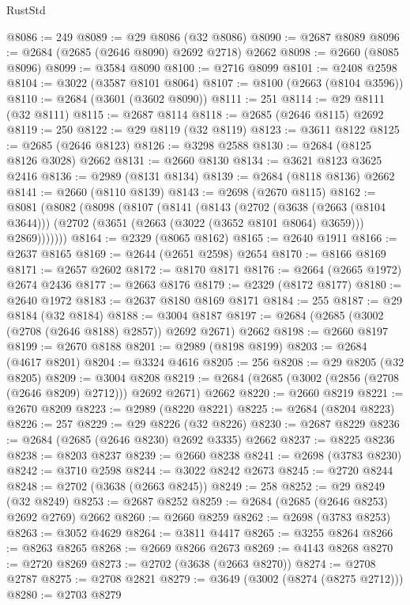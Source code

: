 \begin{lexlean}{RustStd}
\begin{coremodule}
@8086 := 249
@8089 := @29 @8086 (@32 @8086)
@8090 := @2687 @8089
@8096 := @2684 (@2685 (@2646 @8090) @2692 @2718) @2662
@8098 := @2660 (@8085 @8096)
@8099 := @3584 @8090
@8100 := @2716 @8099
@8101 := @2408 @2598
@8104 := @3022 (@3587 @8101 @8064)
@8107 := @8100 (@2663 (@8104 @3596))
@8110 := @2684 (@3601 (@3602 @8090))
@8111 := 251
@8114 := @29 @8111 (@32 @8111)
@8115 := @2687 @8114
@8118 := @2685 (@2646 @8115) @2692
@8119 := 250
@8122 := @29 @8119 (@32 @8119)
@8123 := @3611 @8122
@8125 := @2685 (@2646 @8123)
@8126 := @3298 @2588
@8130 := @2684 (@8125 @8126 @3028) @2662
@8131 := @2660 @8130
@8134 := @3621 @8123 @3625 @2416
@8136 := @2989 (@8131 @8134)
@8139 := @2684 (@8118 @8136) @2662
@8141 := @2660 (@8110 @8139)
@8143 := @2698 (@2670 @8115)
@8162 := @8081
    (@8082
      (@8098
        (@8107
          (@8141
            (@8143
              (@2702
                (@3638 (@2663 (@8104 @3644)))
                (@2702 (@3651 (@2663 (@3022 (@3652 @8101 @8064) @3659))) @2869)))))))
@8164 := @2329 (@8065 @8162)
@8165 := @2640 @1911
@8166 := @2637 @8165
@8169 := @2644 (@2651 @2598) @2654
@8170 := @8166 @8169
@8171 := @2657 @2602
@8172 := @8170 @8171
@8176 := @2664 (@2665 @1972) @2674 @2436
@8177 := @2663 @8176
@8179 := @2329 (@8172 @8177)
@8180 := @2640 @1972
@8183 := @2637 @8180 @8169 @8171
@8184 := 255
@8187 := @29 @8184 (@32 @8184)
@8188 := @3004 @8187
@8197 := @2684 (@2685 (@3002 (@2708 (@2646 @8188) @2857)) @2692 @2671) @2662
@8198 := @2660 @8197
@8199 := @2670 @8188
@8201 := @2989 (@8198 @8199)
@8203 := @2684 (@4617 @8201)
@8204 := @3324 @4616
@8205 := 256
@8208 := @29 @8205 (@32 @8205)
@8209 := @3004 @8208
@8219 := @2684 (@2685 (@3002 (@2856 (@2708 (@2646 @8209) @2712))) @2692 @2671) @2662
@8220 := @2660 @8219
@8221 := @2670 @8209
@8223 := @2989 (@8220 @8221)
@8225 := @2684 (@8204 @8223)
@8226 := 257
@8229 := @29 @8226 (@32 @8226)
@8230 := @2687 @8229
@8236 := @2684 (@2685 (@2646 @8230) @2692 @3335) @2662
@8237 := @8225 @8236
@8238 := @8203 @8237
@8239 := @2660 @8238
@8241 := @2698 (@3783 @8230)
@8242 := @3710 @2598
@8244 := @3022 @8242 @2673
@8245 := @2720 @8244
@8248 := @2702 (@3638 (@2663 @8245))
@8249 := 258
@8252 := @29 @8249 (@32 @8249)
@8253 := @2687 @8252
@8259 := @2684 (@2685 (@2646 @8253) @2692 @2769) @2662
@8260 := @2660 @8259
@8262 := @2698 (@3783 @8253)
@8263 := @3052 @4629
@8264 := @3811 @4417
@8265 := @3255 @8264
@8266 := @8263 @8265
@8268 := @2669 @8266 @2673
@8269 := @4143 @8268
@8270 := @2720 @8269
@8273 := @2702 (@3638 (@2663 @8270))
@8274 := @2708 @2787
@8275 := @2708 @2821
@8279 := @3649 (@3002 (@8274 (@8275 @2712)))
@8280 := @2703 @8279

\end{coremodule}
\end{lexlean}
